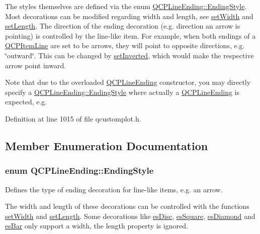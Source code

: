 The styles themselves are defined via the enum \hyperlink{class_q_c_p_line_ending_a5ef16e6876b4b74959c7261d8d4c2cd5}{Q\+C\+P\+Line\+Ending\+::\+Ending\+Style}. Most decorations can be modified regarding width and length, see \hyperlink{class_q_c_p_line_ending_a26dc020ea985a72cc25881ce2115e34e}{set\+Width} and \hyperlink{class_q_c_p_line_ending_ae36fa01763751cd64b7f56c3507e935a}{set\+Length}. The direction of the ending decoration (e.\+g. direction an arrow is pointing) is controlled by the line-\/like item. For example, when both endings of a \hyperlink{class_q_c_p_item_line}{Q\+C\+P\+Item\+Line} are set to be arrows, they will point to opposite directions, e.\+g. \char`\"{}outward\char`\"{}. This can be changed by \hyperlink{class_q_c_p_line_ending_a580e4e2360b35ebb8d68f3494aa2335d}{set\+Inverted}, which would make the respective arrow point inward.

Note that due to the overloaded \hyperlink{class_q_c_p_line_ending}{Q\+C\+P\+Line\+Ending} constructor, you may directly specify a \hyperlink{class_q_c_p_line_ending_a5ef16e6876b4b74959c7261d8d4c2cd5}{Q\+C\+P\+Line\+Ending\+::\+Ending\+Style} where actually a \hyperlink{class_q_c_p_line_ending}{Q\+C\+P\+Line\+Ending} is expected, e.\+g. 
\begin{DoxyCodeInclude}
\end{DoxyCodeInclude}


Definition at line 1015 of file qcustomplot.\+h.



\subsection{Member Enumeration Documentation}
\hypertarget{class_q_c_p_line_ending_a5ef16e6876b4b74959c7261d8d4c2cd5}{}
\subsubsection[{Ending\+Style}]{\setlength{\rightskip}{0pt plus 5cm}enum {\bf Q\+C\+P\+Line\+Ending\+::\+Ending\+Style}}\label{class_q_c_p_line_ending_a5ef16e6876b4b74959c7261d8d4c2cd5}
Defines the type of ending decoration for line-\/like items, e.\+g. an arrow.



The width and length of these decorations can be controlled with the functions \hyperlink{class_q_c_p_line_ending_a26dc020ea985a72cc25881ce2115e34e}{set\+Width} and \hyperlink{class_q_c_p_line_ending_ae36fa01763751cd64b7f56c3507e935a}{set\+Length}. Some decorations like \hyperlink{class_q_c_p_line_ending_a5ef16e6876b4b74959c7261d8d4c2cd5ae5a3414916817258bcc6dddd605e8f5c}{es\+Disc}, \hyperlink{class_q_c_p_line_ending_a5ef16e6876b4b74959c7261d8d4c2cd5ae1836502fa43d8990bb62b2d493a140a}{es\+Square}, \hyperlink{class_q_c_p_line_ending_a5ef16e6876b4b74959c7261d8d4c2cd5a378fe5a8b768411b0bc1765210fe7200}{es\+Diamond} and \hyperlink{class_q_c_p_line_ending_a5ef16e6876b4b74959c7261d8d4c2cd5a2cf543bbca332df26d89bf779f50469f}{es\+Bar} only support a width, the length property is ignored.

